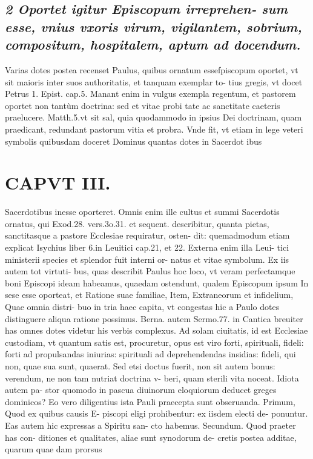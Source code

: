 \documentclass{article}
\begin{document}
\begin{pages}
\subsection*{\textit{2 Oportet igitur Episcopum irreprehen- sum esse, vnius vxoris virum, vigilantem, sobrium, compositum, hospitalem, aptum ad docendum. }}\pstart Varias dotes postea recenset Paulus, quibus ornatum essefpiscopum oportet, vt sit maioris inter suos authoritatis, et tanquam exemplar to- tius gregis, vt docet Petrus 1. Epist. cap.5. Manant enim in vulgus exempla regentum, et pastorem oportet non tantùm doctrina: sed et vitae probi tate ac sanctitate caeteris praelucere. Matth.5.vt sit sal, quia quodammodo in ipsius Dei doctrinam, quam praedicant, redundant pastorum vitia et probra. Vnde fit, vt etiam in lege veteri symbolis quibusdam doceret Dominus quantas dotes in Sacerdot ibus  \pend
\section*{CAPVT  III. }
\marginpar{[ p.101 ]}\pstart Sacerdotibus inesse oporteret. Omnis enim ille cultus et summi Sacerdotis ornatus, qui Exod.28. vers.3o.31. et sequent. describitur, quanta pietas, sanctitasque a pastore Ecclesiae requiratur, osten- dit: quemadmodum etiam explicat Isychius liber  6.in Leuitici cap.21, et 22. Externa enim illa Leui- tici ministerii species et splendor fuit interni or- natus et vitae symbolum. Ex iis autem tot virtuti- bus, quas describit Paulus hoc loco, vt veram perfectamque boni Episcopi ideam habeamus, quaedam ostendunt, qualem Episcopum ipsum In sese esse oporteat, et Ratione suae familiae, Item, Extraneorum et infidelium, Quae omnia distri- buo in tria haec capita, vt congestas hic a Paulo dotes distinguere aliqua ratione possimus. Berna. autem Sermo.77. in Cantica breuiter has omnes dotes videtur his verbis complexus. Ad solam ciuitatis, id est Ecclesiae custodiam, vt quantum satis est, procuretur, opus est viro forti, spirituali, fideli: forti ad propulsandas iniurias: spirituali ad deprehendendas insidias: fideli, qui non, quae sua sunt, quaerat. Sed etsi doctus fuerit, non sit autem bonus: verendum, ne non tam nutriat doctrina v- beri, quam sterili vita noceat. Idiota autem pa- stor quomodo in pascua diuinorum eloquiorum deducet greges dominicos?  \pend\pstart Eo vero diligentius ista Pauli praecepta sunt obseruanda. Primum, Quod ex quibus causis E- piscopi eligi prohibentur: ex iisdem electi de- ponuntur. Eas autem hic expressas a Spiritu san- cto habemus. Secundum. Quod praeter has con- ditiones et qualitates, aliae sunt synodorum de- cretis postea additae, quarum quae dam prorsus  \pend

\end{pages}
\end{document}
